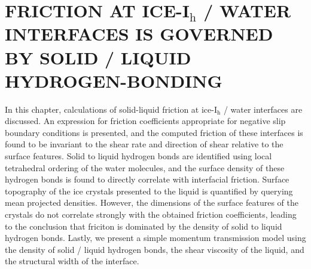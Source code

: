 \chapter{FRICTION AT ICE-I$_\mathrm{h}$ / WATER INTERFACES IS GOVERNED
  BY SOLID / LIQUID HYDROGEN-BONDING}\label{chap:Friction}

In this chapter, calculations of solid-liquid friction at
ice-I$_\mathrm{h}$ / water interfaces are discussed.  An expression
for friction coefficients appropriate for negative slip boundary
conditions is presented, and the computed friction of these interfaces
is found to be invariant to the shear rate and direction of shear
relative to the surface features. Solid to liquid hydrogen bonds are
identified using local tetrahedral ordering of the water molecules,
and the surface density of these hydrogen bonds is found to directly
correlate with interfacial friction. Surface topography of the ice
crystals presented to the liquid is quantified by querying mean
projected densities. However, the dimensions of the surface features
of the crystals do not correlate strongly with the obtained friction
coefficients, leading to the conclusion that friciton is dominated by
the density of solid to liquid hydrogen bonds.  Lastly, we
present a simple momentum transmission model using the density of
solid / liquid hydrogen bonds, the shear viscosity of the liquid, and
the structural width of the interface.




